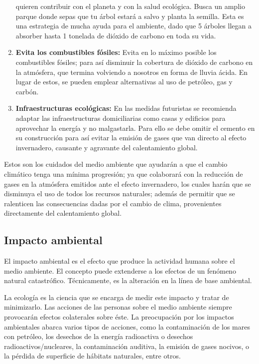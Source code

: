 \begin{enumerate}
	      quieren contribuir con el planeta y con la salud ecológica. Busca un amplio parque
	      donde sepas que tu árbol estará a salvo y planta la semilla. Esta es una estrategia de
	      mucha ayuda para el ambiente, dado que 5 árboles llegan a absorber hasta 1 tonelada
	      de dióxido de carbono en toda su vida.
	\item \textbf{Evita los combustibles fósiles:} Evita en lo máximo posible los combustibles fósiles; para así disminuir la
	      cobertura de dióxido de carbono en la atmósfera, que termina volviendo a nosotros en
	      forma de lluvia ácida. En lugar de estos, se pueden emplear alternativas al uso de
	      petróleo, gas y carbón.
	\item \textbf{Infraestructuras ecológicas:} En las medidas futuristas se recomienda adaptar las infraestructuras domiciliarias
	      como casas y edificios para aprovechar la energía y no malgastarla. Para ello se debe
	      omitir el cemento en su construcción para así evitar la emisión de gases que van
	      directo al efecto invernadero, causante y agravante del calentamiento global.
\end{enumerate}

Estos son los cuidados del medio ambiente que ayudarán a que el cambio
climático tenga una mínima progresión; ya que colaborará con la reducción de gases
en la atmósfera emitidos ante el efecto invernadero, los cuales harán que se disminuya
el uso de todos los recursos naturales; además de permitir que se ralenticen las
consecuencias dadas por el cambio de clima, provenientes directamente del
calentamiento global.

\subsection{Impacto ambiental}

El impacto ambiental es el efecto que produce la actividad humana sobre el
medio ambiente. El concepto puede extenderse a los efectos de un fenómeno natural
catastrófico. Técnicamente, es la alteración en la línea de base ambiental.

La ecología es la ciencia que se encarga de medir este impacto y tratar de minimizarlo.
Las acciones de las personas sobre el medio ambiente siempre provocarán
efectos colaterales sobre éste. La preocupación por los impactos ambientales abarca
varios tipos de acciones, como la contaminación de los mares con petróleo, los
desechos de la energía radioactiva o desechos radioactivos/nucleares, la
contaminación auditiva, la emisión de gases nocivos, o la pérdida de superficie de
hábitats naturales, entre otros.

